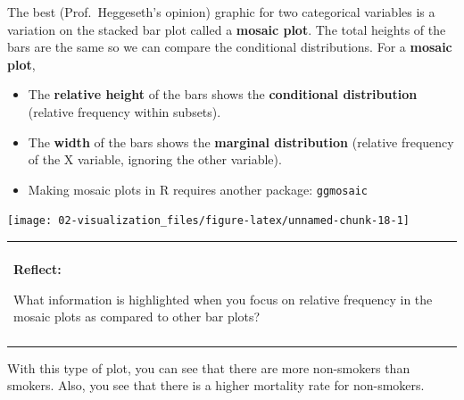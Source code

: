 \documentclass[
]{book}
\newenvironment{Shaded}{\begin{snugshade}}{\end{snugshade}}
\newcommand{\DataTypeTok}[1]{\textcolor[rgb]{0.13,0.29,0.53}{#1}}
\newcommand{\KeywordTok}[1]{\textcolor[rgb]{0.13,0.29,0.53}{\textbf{#1}}}
\newcommand{\NormalTok}[1]{#1}
\newcommand{\OperatorTok}[1]{\textcolor[rgb]{0.81,0.36,0.00}{\textbf{#1}}}
\newcommand{\StringTok}[1]{\textcolor[rgb]{0.31,0.60,0.02}{#1}}
\providecommand{\tightlist}{%
  \setlength{\itemsep}{0pt}\setlength{\parskip}{0pt}}
\newenvironment{reflect}
{
    \begin{center}
    
    \begin{tabular}{|p{0.8\textwidth}|}
    \rowcolor{LightBlue}
    \hline\\
    \rowcolor{LightBlue}
    \textbf{Reflect:}
}
{
    \\\rowcolor{LightBlue}
    \\\hline
    \end{tabular} 
    \end{center}
}
\begin{document}
The best (Prof.~Heggeseth's opinion) graphic for two categorical variables is a variation on the stacked bar plot called a \textbf{mosaic plot}. The total heights of the bars are the same so we can compare the conditional distributions. For a \textbf{mosaic plot},

\begin{itemize}
\tightlist
\item
  The \textbf{relative height} of the bars shows the \textbf{conditional distribution} (relative frequency within subsets).
\item
  The \textbf{width} of the bars shows the \textbf{marginal distribution} (relative frequency of the X variable, ignoring the other variable).
\item
  Making mosaic plots in R requires another package: \texttt{ggmosaic}
\end{itemize}

\begin{Shaded}
\end{Shaded}

\begin{center}\texttt{[image: 02-visualization\_files/figure-latex/unnamed-chunk-18-1]} \end{center}

\begin{reflect}
What information is highlighted when you focus on relative frequency in
the mosaic plots as compared to other bar plots?
\end{reflect}

With this type of plot, you can see that there are more non-smokers than smokers. Also, you see that there is a higher mortality rate for non-smokers.
\end{document}
